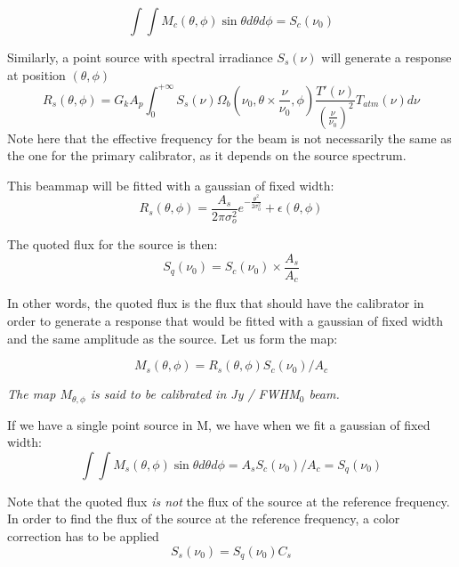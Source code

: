 \begin{equation}
\int\int M_{c}(\theta, \phi) \sin \theta d\theta d\phi = S_{c}(\nu_{0})
\end{equation}

Similarly, a point source with spectral irradiance $S_{s}(\nu)$ will
generate a response at position $(\theta, \phi)$
\begin{equation}
R_{s}(\theta, \phi) =  G_{k} A_{p}  \int_{0}^{+\infty}
S_{s}(\nu) \Omega_{b}(\nu_{0}, \theta \times \frac{\nu}{\nu_{0}},
\phi) \frac{T'(\nu)}{\left(\frac{\nu}{\nu_{0}}\right)^{2}}
T_{atm}(\nu) d\nu
\end{equation}
Note here that the effective frequency for the beam is not necessarily
the same as the one for the primary calibrator, as it depends on the
source spectrum.


This beammap will be fitted with a gaussian of fixed width:
\begin{equation} 
R_{s}(\theta, \phi)  = \frac{A_{s}}{2 \pi \sigma_{o}^{2}}
e^{-\frac{\theta^{2}}{2\sigma_{0}^{2}}}  + \epsilon(\theta, \phi)
\end{equation}

The quoted flux for the source is then:
\begin{equation}
S_{q}(\nu_{0}) =  S_{c} (\nu_{0})  \times \frac{A_{s}}{A_{c}}
\end{equation}

In other words, the quoted flux is the flux that should have the
calibrator in order to generate a response that would be fitted with a
gaussian of fixed width and the same amplitude as the source.
Let us form the map:

\begin{equation}
M_{s}(\theta, \phi) = R_{s}(\theta, \phi)   S_{c} (\nu_{0}) / A_{c}
\end{equation}

 {\em The map $M_{\theta, \phi}$ is said to be calibrated in Jy / FWHM$_{0}$ beam.}

If we have a single point source in M, we have when we fit a gaussian
of fixed width:
\begin{equation}
\int \int M_{s}(\theta, \phi) \sin \theta d\theta d\phi = A_{s}  S_{c} (\nu_{0}) /
A_{c} = S_{q}(\nu_{0})
\end{equation}


Note that the quoted flux {\em is not} the flux of the source at the
reference frequency. In order to find the flux of the source at the
reference frequency, a color correction has to be applied
\begin{equation}
S_{s}(\nu_{0}) = S_{q}(\nu_{0})  C_{s}
\end{equation}

